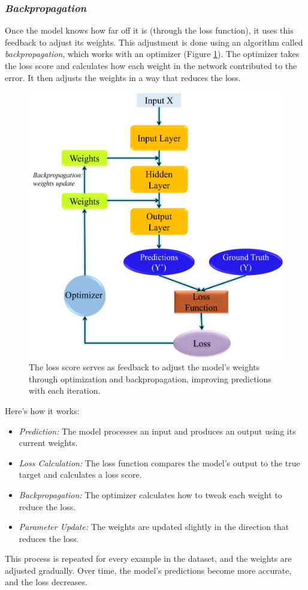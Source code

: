\subsubsection*{\textit{Backpropagation}} 
Once the model knows how far off it is (through the loss function), it uses this feedback to adjust its weights. This adjustment is done using an algorithm called \textit{backpropagation}, which works with an optimizer (Figure \ref{fig:dl_mech3}). The optimizer takes the loss score and calculates how each weight in the network contributed to the error. It then adjusts the weights in a way that reduces the loss.
\begin{figure}[h]
    \centering
    \includegraphics[width=0.7\linewidth]{images/dl_mech3.png}
    \caption{The loss score serves as feedback to adjust the model's weights through optimization and backpropagation, improving predictions with each iteration.}
    \label{fig:dl_mech3}
\end{figure}
Here’s how it works:
\begin{itemize}
    \item \textit{Prediction:} The model processes an input and produces an output using its current weights.
    \item \textit{Loss Calculation:} The loss function compares the model’s output to the true target and calculates a loss score.
    \item \textit{Backpropagation:} The optimizer calculates how to tweak each weight to reduce the loss.
    \item \textit{Parameter Update:} The weights are updated slightly in the direction that reduces the loss.
    \end{itemize}
This process is repeated for every example in the dataset, and the weights are adjusted gradually. Over time, the model’s predictions become more accurate, and the loss decreases.

